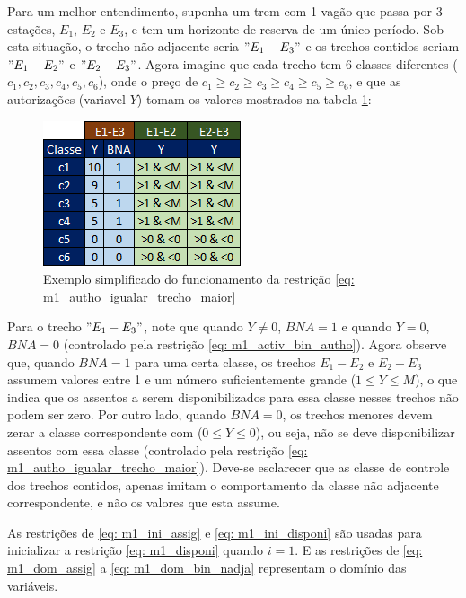 Para um melhor entendimento, suponha um trem com 1 vagão que passa por 3 estações, $E_1$, $E_2$ e $E_3$, e tem um horizonte de reserva de um único período. Sob esta situação, o trecho não adjacente seria $"E_1-E_3"$ e os trechos contidos seriam $"E_1-E_2"$ e $"E_2-E_3"$. Agora imagine que cada trecho tem 6 classes diferentes ($c_1, c_2, c_3, c_4, c_5, c_6$), onde o preço  de  $c_1 \geq c_2 \geq c_3 \geq c_4 \geq c_5 \geq c_6$, e que as autorizações (variavel $Y$) tomam os valores mostrados na tabela \ref{fig: exemplo_sip}:

\begin{figure}[!ht]
	\begin{center}
		\includegraphics[scale=0.8]{img/tab_trechos_maiores.png}
		\caption{Exemplo simplificado do funcionamento da restrição \ref{eq: m1_autho_igualar_trecho_maior}}
		\label{fig: exemplo_sip}
	\end{center}
\end{figure}

Para o trecho $"E_1-E_3"$, note que quando $Y \neq 0$, $BNA = 1$ e quando $Y = 0$, $BNA = 0$ (controlado pela restrição \ref{eq: m1_activ_bin_autho}). Agora observe que, quando $ BNA = 1$ para uma certa classe, os trechos $E_1-E_2$ e $E_2-E_3$ assumem valores entre 1 e um número suficientemente grande ($1 \le Y \leq M$), o que indica que os assentos a serem disponibilizados para essa classe nesses trechos não podem ser zero. Por outro lado, quando $BNA = 0$, os trechos menores devem zerar a classe correspondente com ($0 \leq Y \leq 0$), ou seja, não se deve disponibilizar assentos com essa classe (controlado pela restrição \ref{eq: m1_autho_igualar_trecho_maior}). Deve-se esclarecer que as classe de controle dos trechos contidos, apenas imitam o comportamento da classe não adjacente correspondente, e não os valores que esta assume.

As restrições de \ref{eq: m1_ini_assig} e \ref{eq: m1_ini_disponi} são usadas para inicializar a restrição \ref{eq: m1_disponi} quando \(i = 1\). E as restrições de \ref{eq: m1_dom_assig} a \ref{eq: m1_dom_bin_nadja} representam o domínio das variáveis.

